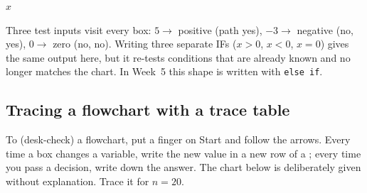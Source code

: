 \documentclass[11pt,a4paper]{article}
\begin{document}
\begin{center}
\begin{minipage}[c]{0.52\linewidth}\centering
{}
\end{minipage}\hfill
\begin{minipage}[c]{0.44\linewidth}
\begin{pseudobox}
\begin{algorithmic}[1]
\START
\State \READ $x$
  \State \PRINT {}
\ElseX
    \State \PRINT {}
  \ElseX
    \State \PRINT {}
  \EndIfX
\EndIfX
\STOP
\end{algorithmic}
\end{pseudobox}
\end{minipage}
\end{center}
Three test inputs visit every box: $5 \to$ positive (path yes), $-3 \to$ negative (no, yes), $0 \to$ zero (no, no). Writing three separate IFs ($x>0$, $x<0$, $x=0$) gives the same output here, but it re-tests conditions that are already known and no longer matches the chart. In Week~5 this shape is written with \texttt{else if}.

\subsection{Tracing a flowchart with a trace table}\label{sec:trace}
To  (desk-check) a flowchart, put a finger on Start and follow the arrows. Every time a box changes a variable, write the new value in a new row of a ; every time you pass a decision, write down the answer. The chart below is deliberately given without explanation. Trace it for $n = 20$.
\end{document}
